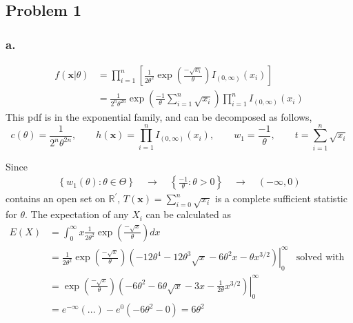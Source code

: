 \documentclass{article}
\begin{document}
\setlength{\headheight}{4\baselineskip}



\subsection*{Problem 1}
\subsubsection*{a.}

\begin{align*}
f(\mathbf{x}|\theta)&=\prod_{i=1}^n\left[\frac{1}{2\theta^2}\exp{\left(\frac{-\sqrt{x_i}}{\theta}\right)}I_{(0,\infty)}(x_i)\right] \\
&=\frac{1}{2^n\theta^{2n}}\exp{\left(\frac{-1}{\theta}\sum_{i=1}^n\sqrt{x_i}\right)}\prod_{i=1}^nI_{(0,\infty)}(x_i)
\end{align*}
This pdf is in the exponential family, and can be decomposed as follows, 
\[
c(\theta)=\frac{1}{2^n\theta^{2n}}, \qquad h(\mathbf{x})=\prod_{i=1}^n I_{(0,\infty)}(x_i), \qquad w_1=\frac{-1}{\theta}, \qquad t = \sum_{i=1}^n\sqrt{x_i}
\]
\iffalse
Due to factorization (Theorem 6.2.6), $T(\mathbf{x}) = \sum_{i=0}^n\sqrt{x_i}$ is a sufficient statistic for $\theta$. 
\fi
Since
\begin{align*}
\left\{w_1(\theta):\theta \in \Theta\right\}\quad \rightarrow\quad \left\{\frac{-1}{\theta}:\theta > 0\right\}\quad \rightarrow\quad \left(-\infty, 0\right)
\end{align*} 
contains an open set on $\mathbb{R}^\prime$, $T(\mathbf{x}) = \sum_{i=0}^n\sqrt{x_i}$ is a complete sufficient statistic for $\theta$. The expectation of any $X_i$ can be calculated as 
\begin{align*}
E(X) &= \int_0^\infty x\frac{1}{2\theta^2}\exp{\left(\frac{-\sqrt{x}}{\theta}\right)} dx \\
&=\left.\frac{1}{2\theta^2}\exp{\left(\frac{-\sqrt{x}}{\theta}\right)}\left(-12\theta^4-12\theta^3\sqrt{x}-6\theta^2x-\theta x^{3/2}\right)\right|_0^\infty &\text{solved with Wolfram Alpha} \\
&=\left.\exp{\left(\frac{-\sqrt{x}}{\theta}\right)}\left(-6\theta^2-6\theta\sqrt{x}-3x-\frac{1}{2\theta}x^{3/2}\right)\right|_0^\infty \\
&= e^{-\infty}(...)-e^0\left(-6\theta^2-0\right) = 6\theta^2
\end{align*}
\end{document}
